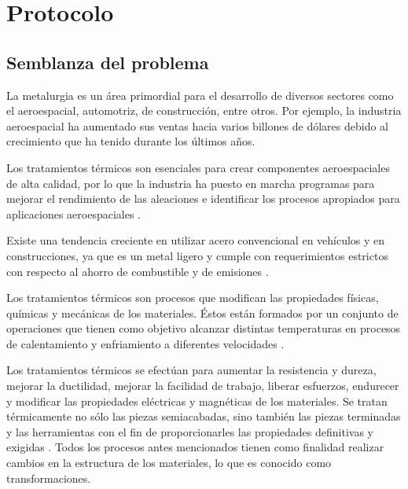 
\chapter{Protocolo} %
\label{ch:protocolo} 

\section{Semblanza del problema}

La metalurgia es un área primordial para el desarrollo de diversos sectores como el aeroespacial, automotriz, de construcción, entre otros. Por ejemplo, la industria aeroespacial ha aumentado sus ventas hacia varios billones de dólares debido al crecimiento que ha tenido durante los últimos años.

Los tratamientos térmicos son esenciales para crear componentes aeroespaciales de alta calidad, por lo que
la industria ha puesto en marcha programas para mejorar el rendimiento de las aleaciones e identificar los procesos apropiados para aplicaciones aeroespaciales \cite{BREWER1998}.

Existe una tendencia creciente en utilizar acero convencional en vehículos y en construcciones, ya que es un metal ligero y cumple con requerimientos estrictos con respecto al ahorro de combustible y de emisiones  \cite{cole1995light}.
 




Los tratamientos térmicos son procesos que modifican las propiedades físicas, químicas y mecánicas de los materiales. 
Éstos están formados por un conjunto de operaciones que tienen como objetivo alcanzar distintas temperaturas en procesos de calentamiento y enfriamiento a diferentes velocidades \cite{moleraTratamientosMarcomo}.
 
Los tratamientos térmicos se efectúan para aumentar la resistencia y dureza, mejorar la ductilidad, mejorar la facilidad de trabajo, liberar esfuerzos, endurecer  y modificar las propiedades eléctricas y magnéticas de los materiales.
Se tratan térmicamente no sólo las piezas semiacabadas, %
sino también las piezas terminadas y las herramientas con el fin de proporcionarles las propiedades definitivas y exigidas \cite{TratamientosAcerosTesis}.
Todos los procesos  antes mencionados tienen como finalidad realizar cambios en la estructura de los materiales, lo que es conocido como transformaciones.


